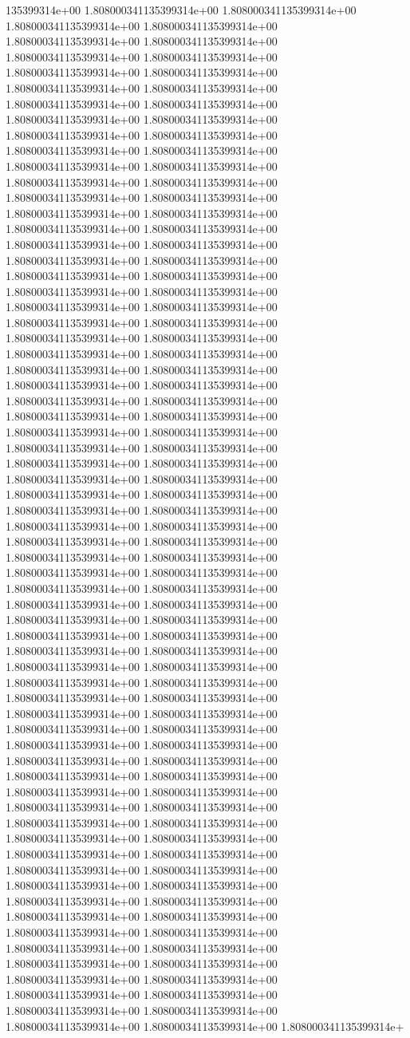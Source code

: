 135399314e+00	1.808000341135399314e+00	1.808000341135399314e+00	1.808000341135399314e+00	1.808000341135399314e+00	1.808000341135399314e+00	1.808000341135399314e+00	1.808000341135399314e+00	1.808000341135399314e+00	1.808000341135399314e+00	1.808000341135399314e+00	1.808000341135399314e+00	1.808000341135399314e+00	1.808000341135399314e+00	1.808000341135399314e+00	1.808000341135399314e+00	1.808000341135399314e+00	1.808000341135399314e+00	1.808000341135399314e+00	1.808000341135399314e+00	1.808000341135399314e+00	1.808000341135399314e+00	1.808000341135399314e+00	1.808000341135399314e+00	1.808000341135399314e+00	1.808000341135399314e+00	1.808000341135399314e+00	1.808000341135399314e+00	1.808000341135399314e+00	1.808000341135399314e+00	1.808000341135399314e+00	1.808000341135399314e+00	1.808000341135399314e+00	1.808000341135399314e+00	1.808000341135399314e+00	1.808000341135399314e+00	1.808000341135399314e+00	1.808000341135399314e+00	1.808000341135399314e+00	1.808000341135399314e+00	1.808000341135399314e+00	1.808000341135399314e+00	1.808000341135399314e+00	1.808000341135399314e+00	1.808000341135399314e+00	1.808000341135399314e+00	1.808000341135399314e+00	1.808000341135399314e+00	1.808000341135399314e+00	1.808000341135399314e+00	1.808000341135399314e+00	1.808000341135399314e+00	1.808000341135399314e+00	1.808000341135399314e+00	1.808000341135399314e+00	1.808000341135399314e+00	1.808000341135399314e+00	1.808000341135399314e+00	1.808000341135399314e+00	1.808000341135399314e+00	1.808000341135399314e+00	1.808000341135399314e+00	1.808000341135399314e+00	1.808000341135399314e+00	1.808000341135399314e+00	1.808000341135399314e+00	1.808000341135399314e+00	1.808000341135399314e+00	1.808000341135399314e+00	1.808000341135399314e+00	1.808000341135399314e+00	1.808000341135399314e+00	1.808000341135399314e+00	1.808000341135399314e+00	1.808000341135399314e+00	1.808000341135399314e+00	1.808000341135399314e+00	1.808000341135399314e+00	1.808000341135399314e+00	1.808000341135399314e+00	1.808000341135399314e+00	1.808000341135399314e+00	1.808000341135399314e+00	1.808000341135399314e+00	1.808000341135399314e+00	1.808000341135399314e+00	1.808000341135399314e+00	1.808000341135399314e+00	1.808000341135399314e+00	1.808000341135399314e+00	1.808000341135399314e+00	1.808000341135399314e+00	1.808000341135399314e+00	1.808000341135399314e+00	1.808000341135399314e+00	1.808000341135399314e+00	1.808000341135399314e+00	1.808000341135399314e+00	1.808000341135399314e+00	1.808000341135399314e+00	1.808000341135399314e+00	1.808000341135399314e+00	1.808000341135399314e+00	1.808000341135399314e+00	1.808000341135399314e+00	1.808000341135399314e+00	1.808000341135399314e+00	1.808000341135399314e+00	1.808000341135399314e+00	1.808000341135399314e+00	1.808000341135399314e+00	1.808000341135399314e+00	1.808000341135399314e+00	1.808000341135399314e+00	1.808000341135399314e+00	1.808000341135399314e+00	1.808000341135399314e+00	1.808000341135399314e+00	1.808000341135399314e+00	1.808000341135399314e+00	1.808000341135399314e+00	1.808000341135399314e+00	1.808000341135399314e+00	1.808000341135399314e+00	1.808000341135399314e+00	1.808000341135399314e+00	1.808000341135399314e+00	1.808000341135399314e+00	1.808000341135399314e+00	1.808000341135399314e+00	1.808000341135399314e+00	1.808000341135399314e+00	1.808000341135399314e+00	1.808000341135399314e+